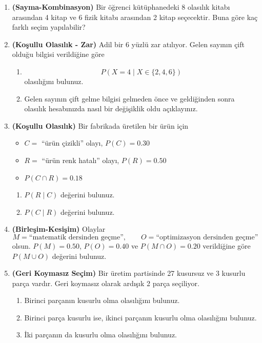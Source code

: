 \documentclass[12pt,a4paper]{article}
\begin{document}
\begin{enumerate}
\item \textbf{(Sayma-Kombinasyon)} Bir öğrenci kütüphanedeki 8 olasılık kitabı arasından 4 kitap ve 6 fizik kitabı arasından 2 kitap seçecektir. Buna göre kaç farklı seçim yapılabilir?

\item \textbf{(Koşullu Olasılık - Zar)} Adil bir 6 yüzlü zar atılıyor. Gelen sayının çift olduğu bilgisi verildiğine göre
\begin{enumerate}
\item \[
P(X=4\mid X\in\{2,4,6\})
\]
olasılığını bulunuz.
\item Gelen sayının çift gelme bilgisi gelmeden önce ve geldiğinden sonra olasılık hesabınızda nasıl bir değişiklik oldu açıklayınız. 
\end{enumerate}

\item \textbf{(Koşullu Olasılık)} Bir fabrikada üretilen bir ürün için
\begin{itemize}
\item $C=$ ``ürün çizikli'' olayı, $P(C)=0.30$
\item $R=$ ``ürün renk hatalı'' olayı, $P(R)=0.50$
\item $P(C\cap R)=0.18$
\end{itemize}
\begin{enumerate}
\item $P(R\mid C)$ değerini bulunuz.
\item $P(C\mid R)$ değerini bulunuz.
\end{enumerate}

\item \textbf{(Birleşim-Kesişim)} Olaylar
\[
M=\text{``matematik dersinden geçme''},\qquad O=\text{``optimizasyon dersinden geçme''}
\]
olsun. $P(M)=0.50$, $P(O)=0.40$ ve $P(M\cap O)=0.20$ verildiğine göre $P(M\cup O)$ değerini bulunuz.

\item \textbf{(Geri Koymasız Seçim)} Bir üretim partisinde 27 kusursuz ve 3 kusurlu parça vardır. Geri koymasız olarak ardışık 2 parça seçiliyor.
\begin{enumerate}
\item Birinci parçanın kusurlu olma olasılığını bulunuz.
\item Birinci parça kusurlu ise, ikinci parçanın kusurlu olma olasılığını bulunuz.
\item İki parçanın da kusurlu olma olasılığını bulunuz.
\end{enumerate}


\end{enumerate}
\end{document}
